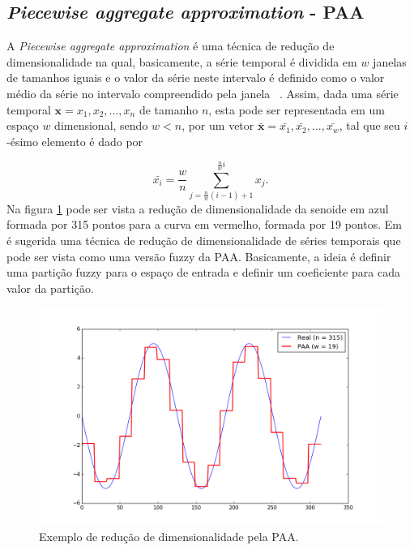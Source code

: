\subsection{\emph{Piecewise aggregate approximation} - 
	PAA}

A \emph{Piecewise aggregate approximation} é uma técnica de redução de dimensionalidade na qual, basicamente, a série temporal é dividida em $w$ janelas de tamanhos iguais e o valor da série neste intervalo é definido como o valor médio da série no intervalo compreendido pela janela ~\parencite{SAX}. Assim, dada uma série temporal $\bm{x} = x_1,x_2,...,x_n$ de tamanho $n$, esta pode ser representada em  um espaço $w$ dimensional, sendo $w<n$, por um vetor $\bm{\bar{x}} =\bar{x_1},\bar{x_2},...,\bar{x_w} $, tal que seu $i$-ésimo elemento é dado por

\begin{equation}
	\bar{x_i} = \frac{w}{n} \sum_{j=\frac{n}{w}(i-1)+1}^{\frac{n}{w}i} x_j.
\end{equation}
Na figura \ref{fig:PAA} pode ser vista a redução de dimensionalidade da senoide em azul formada por 315 pontos para a curva em vermelho, formada por 19 pontos. Em ~\parencite{fuzzy_transform} é sugerida uma técnica de redução de dimensionalidade de séries temporais que pode ser vista como uma versão fuzzy da PAA. Basicamente, a ideia é definir uma partição fuzzy para o espaço de entrada e definir um coeficiente para cada valor da partição.

\begin{figure}[h!]
	\includegraphics[width=\linewidth]{figuras/PAA.png}
	\caption{Exemplo de redução de dimensionalidade pela PAA.}
	\label{fig:PAA}
\end{figure}




